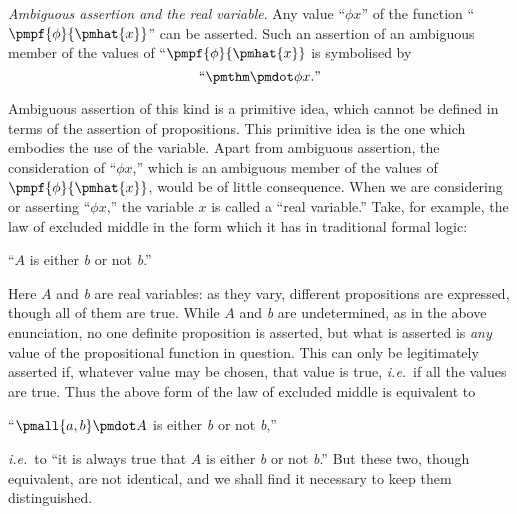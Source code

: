 \documentclass[letterpaper,12pt,openany,leqno]{book}
\begin{document}
\textit{Ambiguous assertion and the real variable}. Any value ``$\phi x$'' of the function ``$\pmpf{\phi}{\pmhat{x}}$'' can be asserted. Such an assertion of an ambiguous member of the values of ``$\pmpf{\phi}{\pmhat{x}}$ is symbolised by
\[  
	\text{``}\pmthm\pmdot \phi x.\text{''}
\]

Ambiguous assertion of this kind is a primitive idea, which cannot be defined in terms of the assertion of propositions. This primitive idea is the one which embodies the use of the variable. Apart from ambiguous assertion, the consideration of ``$\phi x$,'' which is an ambiguous member of the values of $\pmpf{\phi}{\pmhat{x}}$, would be of little consequence. When we are considering or asserting ``$\phi x$,'' the variable $x$ is called a ``real variable.'' Take, for example, the law of excluded middle in the form which it has in traditional formal logic:
\begin{center}
	``$A$ is either \textit{b} or not \textit{b}.''
\end{center}
Here $A$ and \textit{b} are real variables: as they vary, different propositions are expressed, though all of them are true. While $A$ and \textit{b} are undetermined, as in the above enunciation, no one definite proposition is asserted, but what is asserted is \textit{any} value of the propositional function in question. This can only be legitimately asserted if, whatever value may be chosen, that value is true, \textit{i.e.}\ if all the values are true. Thus the above form of the law of excluded middle is equivalent to
\begin{center}
	``$\pmall{a, b}\pmdot A$ is either \textit{b} or not \textit{b},''
\end{center}
\textit{i.e.}\ to ``it is always true that $A$ is either \textit{b} or not \textit{b}.'' But these two, though equivalent, are not identical, and we shall find it necessary to keep them distinguished.
\end{document}
